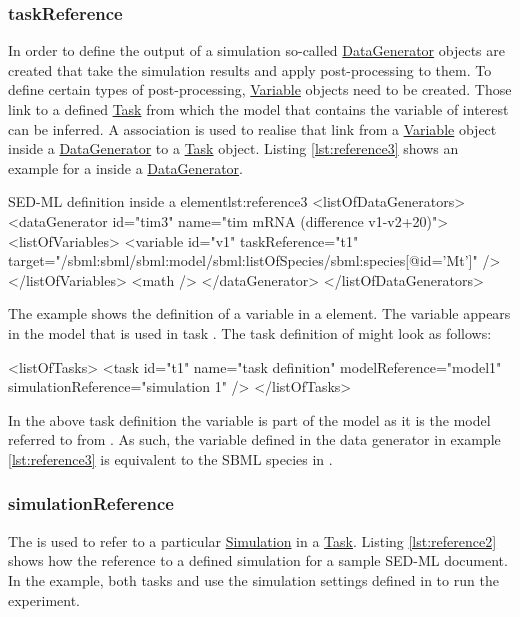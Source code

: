 \subsubsection{taskReference}
\label{sec:taskReference}
In order to define the output of a simulation so-called \hyperref[class:dataGenerator]{DataGenerator} objects are created that take the simulation results and apply post-processing to them. To define certain types of post-processing, \hyperref[class:variable]{Variable} objects need to be created. Those link to a defined \hyperref[class:task]{Task} from which the model that contains the variable of interest can be inferred. 
A  association is used to realise that link from a \hyperref[class:variable]{Variable} object inside a \hyperref[class:dataGenerator]{DataGenerator} to a \hyperref[class:task]{Task} object. 
Listing \ref{lst:reference3} shows an example for a  inside a \hyperref[class:dataGenerator]{DataGenerator}.
%
\begin{myXmlLst}{SED-ML  definition inside a  element}{lst:reference3}
<listOfDataGenerators>
 <dataGenerator id="tim3" name="tim mRNA (difference v1-v2+20)">
  <listOfVariables>
   <variable id="v1" taskReference="t1" target="/sbml:sbml/sbml:model/sbml:listOfSpecies/sbml:species[@id='Mt']" />
  </listOfVariables>
  <math />
 </dataGenerator>
</listOfDataGenerators>
\end{myXmlLst}
%
The example shows the definition of a variable  in a  element. The variable appears in the model that is used in task . The task definition of  might look as follows:
\begin{myXmlLst}{}{}
<listOfTasks>
  <task id="t1" name="task definition" modelReference="model1" 
        simulationReference="simulation 1" />
</listOfTasks>
\end{myXmlLst}
In the above task definition the variable  is part of the model  as it is the model referred to from . As such, the variable defined in the data generator in example \ref{lst:reference3} is equivalent to the SBML species  in .

\subsubsection{simulationReference}
\label{sec:simulationReference}
The  is used to refer to a particular \hyperref[class:simulation]{Simulation} in a \hyperref[class:task]{Task}. 
Listing \ref{lst:reference2} shows how the reference to a defined simulation for a sample SED-ML document. In the example, both tasks  and  use the simulation settings defined in  to run the experiment.
